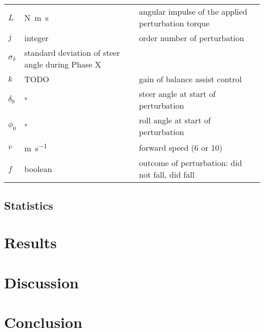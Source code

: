 \documentclass{article}
\begin{document}
\begin{table}
  \begin{tabular}{lll}
    \(L\) & \si{\newton\meter\second} & angular impulse of the applied
    perturbation torque \\
    \(j\) & integer & order number of perturbation \\
    \(\sigma_\delta\) & standard deviation of steer angle during Phase X \\
    \(k\) & TODO & gain of balance assist control \\
    \(\delta_0\) & \si{\degree} & steer angle at start of perturbation \\
    \(\phi_0\) & \si{\degree} & roll angle at start of perturbation \\
    \(v\) & \si{\meter\per\second} & forward speed (6 or 10) \\
    \(f\) & boolean & outcome of perturbation: did not fall, did fall \\
  \end{tabular}
\end{table}

\subsection{Statistics}


\section{Results}

\section{Discussion}

\section{Conclusion}



\end{document}
